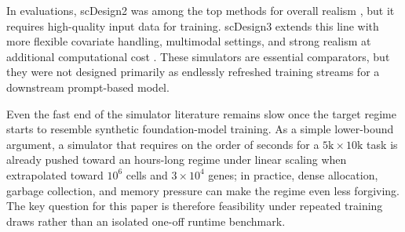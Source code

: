 \documentclass{article}
\begin{document}
In evaluations, scDesign2 was among the top methods for overall realism \cite{crowell2023shaky}, but it requires high-quality input data for training. scDesign3 extends this line with more flexible covariate handling, multimodal settings, and strong realism at additional computational cost \cite{scdesign3,duo2024systematic}. These simulators are essential comparators, but they were not designed primarily as endlessly refreshed training streams for a downstream prompt-based model.

Even the fast end of the simulator literature remains slow once the target regime starts to resemble synthetic foundation-model training. As a simple lower-bound argument, a simulator that requires on the order of seconds for a $5\text{k}\times10\text{k}$ task is already pushed toward an hours-long regime under linear scaling when extrapolated toward $10^6$ cells and $3\times10^4$ genes; in practice, dense allocation, garbage collection, and memory pressure can make the regime even less forgiving. The key question for this paper is therefore feasibility under repeated training draws rather than an isolated one-off runtime benchmark.
\end{document}
